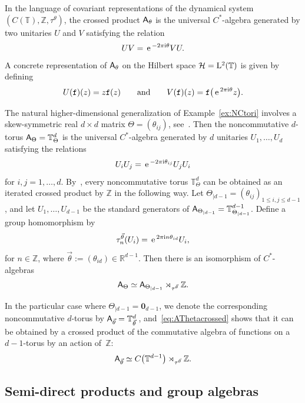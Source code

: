 \documentclass[10pt,a4paper]{amsart}
\numberwithin{equation}{section}
\newcommand{\Z}{\zed}
\newcommand{\mbf}[1]{{\boldsymbol {#1} }}
\def\ii{{{\rm i}}}
\def\A{{\sf A}}
\newcommand{\Aut}{\operatorname{Aut}}
\newcommand{\R}{\real}
\newcommand{\zed}{{\mathbb Z}} %
\newcommand{\real}{{\mathbb R}} %
\newcommand{\torus}{{\mathbb T}} %
\def\hil{{\mathcal H}}
\def\e{{\,\rm e}\,}
\begin{document}
\begin{Example}
In the language of covariant representations of the dynamical system
$(C(\torus),\Z,\tau^\theta)$, the crossed product $\A_\theta$ is the
universal $C^*$-algebra generated by two unitaries $U$ and $V$
satisfying the relation~\cite[Proposition~2.56]{Williams2007}
\begin{gather}\label{eq:C*UV}
U V=\e^{-2\pi\ii \theta} V U .
\end{gather}
A concrete representation
of $\A_\theta$ on the Hilbert space $\hil = {\rm L}^2(\torus)$ is
given by defining
\[
U(\mathtt{f})(z)=z \mathtt{f}(z) \qquad \mbox{and} \qquad V(\mathtt{f})(z) =
\mathtt{f}\big(\e^{2\pi\ii\theta} z\big) .
\]
\end{Example}

\begin{Example}[{{\bf Noncommutative $\mbf{d}$-tori}}]
\label{ex:NCtorid}
The natural higher-dimensional generalization of
Example~\ref{ex:NCtori} involves a skew-symmetric real $d{\times}d$
matrix $\Theta=(\theta_{ij})$, see~\cite{Rieffel1990}. Then the noncommutative $d$-torus
$\A_\Theta=\torus_\Theta^d$ is the universal $C^*$-algebra generated
by $d$ unitaries $U_1,\dots,U_d$ satisfying the relations
\[
U_i U_j = \e^{-2\pi\ii\theta_{ij}} U_j U_i
\]
for $i,j=1,\dots,d$. By~\cite[Lemma~1.5]{Phillips2006}, every
noncommutative torus $\torus_\Theta^d$ can be obtained as an iterated
crossed product by $\Z$ in the following way. Let
$\Theta_{|d-1}=(\theta_{ij})_{1\leq i,j\leq d-1}$, and let
$U_1,\dots,U_{d-1}$ be the standard generators of
$\A_{\Theta_{|d-1}}=\torus^{d-1}_{\Theta_{|d-1}}$. Define a
group homomorphism
\smash{$\tau^{\vec\theta}\colon \Z\to\Aut(\A_{\Theta_{|d-1}})$} by
\[
\tau_n^{\vec\theta}(U_i) = \e^{2\pi\ii n \theta_{id}} U_i
 ,
\]
for $n\in\Z$, where $\vec\theta:=(\theta_{id})\in\R^{d-1}$.
Then there is an isomorphism of $C^*$-algebras
\begin{gather}\label{eq:AThetacrossed}
\A_\Theta\simeq\A_{\Theta_{|d-1}}
\rtimes_{\tau^{\vec\theta}} \Z .
\end{gather}

In the particular case where $\Theta_{|d-1}=\mbf 0_{d-1}$, we denote the
corresponding noncommutative $d$-torus by
$\A_{\vec\theta}=\torus_{\vec\theta}^d\,$, and~\eqref{eq:AThetacrossed}
shows that it can be obtained by a crossed product of the commutative
algebra of functions on a $d{-}1$-torus by an action of~$\Z$:
\[
\A_{\vec\theta} \simeq C\big(\torus^{d-1}\big)\rtimes_{\tau^{\vec\theta}}\Z .
\]
\end{Example}

\subsection{Semi-direct products and group algebras}\label{sec:semidirect}
\end{document}
